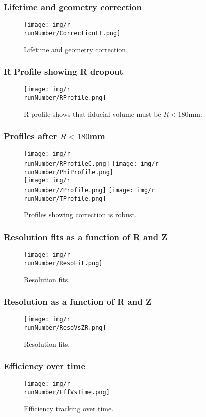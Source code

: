 \begin{frame}
\frametitle{Lifetime and geometry correction}
\begin{figure}
  \begin{center}
      \texttt{[image: img/r\\runNumber/CorrectionLT.png]}
    \caption{Lifetime and geometry correction.}
  \end{center}
\end{figure}
\end{frame}

\begin{frame}
\frametitle{R Profile showing R dropout}
\begin{figure}
  \begin{center}
      \texttt{[image: img/r\\runNumber/RProfile.png]}
    \caption{R profile shows that fiducial volume must be $R < 180$mm.}
  \end{center}
\end{figure}
\end{frame}


\begin{frame}
\frametitle{Profiles after $R < 180$mm}
\begin{figure}
  \begin{center}
      \texttt{[image: img/r\\runNumber/RProfileC.png]}
      \texttt{[image: img/r\\runNumber/PhiProfile.png]} \\
      \texttt{[image: img/r\\runNumber/ZProfile.png]}
      \texttt{[image: img/r\\runNumber/TProfile.png]}
    \caption{Profiles showing correction is robust.}
  \end{center}
\end{figure}
\end{frame}

\begin{frame}
\frametitle{Resolution fits as a function of R and Z}
\begin{figure}
  \begin{center}
      \texttt{[image: img/r\\runNumber/ResoFit.png]}
    \caption{Resolution fits.}
  \end{center}
\end{figure}
\end{frame}

\begin{frame}
\frametitle{Resolution as a function of R and Z}
\begin{figure}
  \begin{center}
      \texttt{[image: img/r\\runNumber/ResoVsZR.png]}
    \caption{Resolution fits.}
  \end{center}
\end{figure}
\end{frame}

\begin{frame}
\frametitle{Efficiency over time}
\begin{figure}
  \begin{center}
      \texttt{[image: img/r\\runNumber/EffVsTime.png]}
    \caption{Efficiency tracking over time.}
  \end{center}
\end{figure}
\end{frame}
